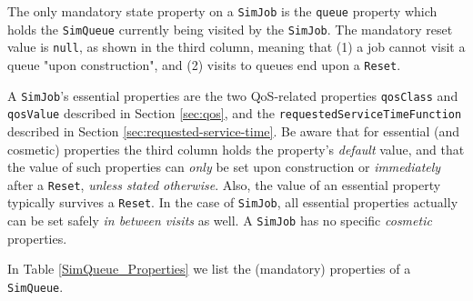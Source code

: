 The only mandatory state property
  on a \lstinline|SimJob|
  is the \lstinline|queue| property
  which holds
  the \lstinline|SimQueue|
  currently being visited by the \lstinline|SimJob|.
The mandatory reset value is \lstinline|null|,
  as shown in the third column,
  meaning that (1) a job cannot visit a queue
  "upon construction", and (2)
  visits to queues end upon a \lstinline|Reset|.

A \lstinline|SimJob|'s essential properties
  are the two QoS-related properties
  \lstinline|qosClass| and \lstinline|qosValue|
  described in Section \ref{sec:qos},
  and the \lstinline|requestedServiceTimeFunction|
  described in Section \ref{sec:requested-service-time}.
Be aware that for essential (and cosmetic) properties
  the third column holds the property's {\em default\/}
  value,
  and that the value of such properties can {\em only\/}
  be set upon construction or {\em immediately\/}
  after a \lstinline|Reset|,
  {\em unless stated otherwise}.
Also,
  the value of an essential property typically
  survives a \lstinline|Reset|.
In the case of \lstinline|SimJob|,
  all essential properties actually
  can be set safely {\em in between visits\/}
  as well.
A \lstinline|SimJob| has no specific
  {\em cosmetic\/} properties.
   
In Table
  \ref{SimQueue_Properties}
  we list the (mandatory) properties
  of a \lstinline|SimQueue|.
  
